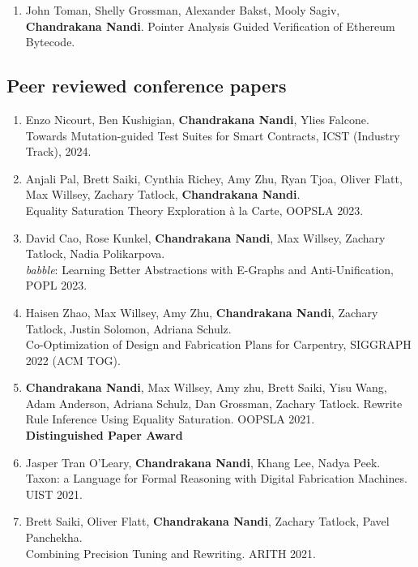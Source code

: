 \documentclass[margin, 10pt]{res} %
\begin{document}
\begin{resume}
\begin{enumerate}
  \item John Toman, Shelly Grossman, Alexander Bakst, Mooly Sagiv, \textbf{Chandrakana Nandi}.
    Pointer Analysis Guided Verification of Ethereum Bytecode.
\end{enumerate}

\subsection{Peer reviewed conference papers}
\begin{enumerate}

  \item Enzo Nicourt, Ben Kushigian, \textbf{Chandrakana Nandi}, Ylies Falcone. \\
    Towards Mutation-guided Test Suites for Smart Contracts, ICST (Industry Track), 2024.

  \item Anjali Pal, Brett Saiki, Cynthia Richey, Amy Zhu, Ryan Tjoa, Oliver Flatt, Max Willsey, Zachary Tatlock, \textbf{Chandrakana Nandi}. \\
    Equality Saturation Theory Exploration à la Carte, OOPSLA 2023.

  \item David Cao, Rose Kunkel, \textbf{Chandrakana Nandi}, Max Willsey, Zachary Tatlock, Nadia Polikarpova. \\
    \textit{babble}: Learning Better Abstractions with E-Graphs and Anti-Unification, POPL 2023.

  \item Haisen  Zhao, Max Willsey, Amy Zhu, \textbf{Chandrakana Nandi}, Zachary Tatlock, Justin Solomon, Adriana Schulz. \\
    Co-Optimization of Design and Fabrication Plans for Carpentry, SIGGRAPH 2022 (ACM TOG).

  \item \textbf{Chandrakana Nandi}, Max Willsey, Amy zhu, Brett Saiki, Yisu Wang, Adam Anderson, Adriana Schulz, Dan Grossman, Zachary Tatlock.
    Rewrite Rule Inference Using Equality Saturation. OOPSLA 2021. \\
    \textbf{Distinguished Paper Award}

  \item Jasper Tran O'Leary, \textbf{Chandrakana Nandi}, Khang Lee, Nadya Peek. \\
  Taxon: a Language for Formal Reasoning with Digital Fabrication Machines. UIST 2021.

\item Brett Saiki, Oliver Flatt, \textbf{Chandrakana Nandi}, Zachary Tatlock, Pavel Panchekha. \\
  Combining Precision Tuning and Rewriting. ARITH 2021.


\end{enumerate}
\end{resume}
\end{document}
